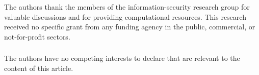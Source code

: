 \documentclass[runningheads]{llncs}
\begin{document}
\begin{credits}
\subsubsection{\ackname} The authors thank the members of the
information-security research group for valuable discussions and for providing
computational resources. This research received no specific grant from any
funding agency in the public, commercial, or not-for-profit sectors.

\subsubsection{\discintname}
The authors have no competing interests to declare that are relevant to the
content of this article.
\end{credits}



\end{document}
